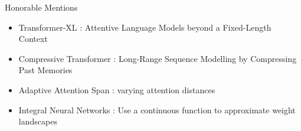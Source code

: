 \begin{frame}[c]{Honorable Mentions}
    \large
    \begin{itemize}[<+(1)->]
        \item Transformer-XL \cite{dai_transformerxl_2019}: Attentive Language Models beyond a Fixed-Length Context
        \item Compressive Transformer \cite{rae_compressive_2019}: Long-Range Sequence Modelling by Compressing Past Memories
        \item Adaptive Attention Span \cite{sukhbaatar_adaptive_2019}: varying attention distances
        \item Integral Neural Networks \cite{solodskikh_integral}: Use a continuous function to approximate weight landscapes
    \end{itemize}
\end{frame}
